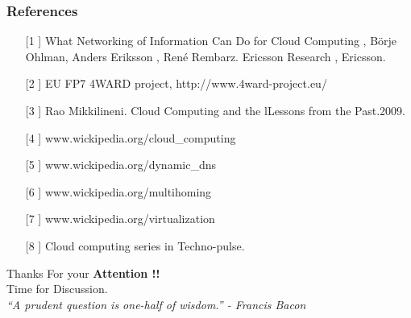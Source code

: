 \documentclass [12pt] {beamer}
\begin{document}
\begin{frame}
\frametitle{References}
\begin{enumerate}
 \item [[1]] What Networking of Information Can Do for Cloud Computing , Börje Ohlman, Anders Eriksson , René Rembarz. Ericsson Research , Ericsson. 
 \item [[2]] EU FP7 4WARD project, http://www.4ward-project.eu/
 \item [[3]] Rao Mikkilineni. Cloud Computing and the lLessons from the Past.2009.
 \item [[4]] www.wickipedia.org/cloud\_computing
 \item [[5]] www.wickipedia.org/dynamic\_dns
 \item [[6]] www.wickipedia.org/multihoming
 \item [[7]] www.wickipedia.org/virtualization
 \item [[8]] Cloud computing series in Techno-pulse.
\end{enumerate}
\end{frame}

\begin{frame}
 \begin{center}
  Thanks For your \textbf{Attention !!} \\[1 cm] 
  Time for Discussion.\\[2cm]
\emph{``A prudent question is one-half of wisdom.'' - Francis Bacon}
 \end{center}
\end{frame}
\end{document}
